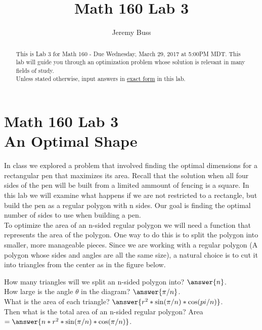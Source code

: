 \documentclass[handout,nooutcomes]{ximera}
\title{Math 160 Lab 3}
\author{Jeremy Buss} %
\begin{document}
\section{Math 160 Lab 3 \\ An Optimal Shape}

\begin{abstract}
This is Lab 3 for Math 160 - Due Wednesday, March 29, 2017 at 5:00PM MDT.
This lab will guide you through an optimization problem whose solution is relevant in many fields of study.\\

Unless stated otherwise, input answers in \underline{exact form} in this lab.
\end{abstract}

\maketitle

In class we explored a problem that involved finding the optimal dimensions for a rectangular pen that maximizes its area. Recall that the solution when all four sides of the pen will be built from a limited ammount of fencing is a square. In this lab we will examine what happens if we are not restricted to a rectangle, but build the pen as a regular polygon with n sides. Our goal is finding the optimal number of sides to use when building a pen.\\
\medskip
To optimize the area of an n-sided regular polygon we will need a function that represents the area of the polygon. One way to do this is to split the polygon into smaller, more manageable pieces. Since we are working with a regular polygon (A polygon whose sides and angles are all the same size), a natural choice is to cut it into triangles from the center as in the figure below.


How many triangles will we split an n-sided polygon into? $\answer{n}$.\\
How large is the angle $\theta$ in the diagram? $\answer{\pi/n}$.\\
What is the area of each triangle? $\answer{r^2*\sin(\pi/n)*\cos(pi/n)}$.\\
Then what is the total area of an n-sided regular polygon? Area $=\answer{n*r^2*\sin(\pi/n)*\cos(\pi/n)}$.\\
\end{document}
